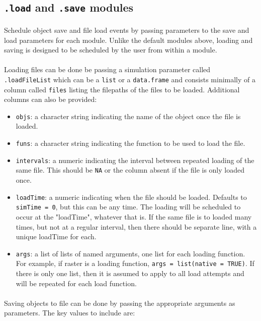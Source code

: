 \documentclass{article}
\begin{document}
\subsection{\texttt{.load} and \texttt{.save} modules}\label{load-and-save-modules}
\paragraph{}
Schedule object save and file load events by passing parameters to the save and load parameters for each module. Unlike the default modules above, loading and saving is designed to be scheduled by the user from within a module.

\paragraph{}
Loading files can be done be passing a simulation parameter called \texttt{.loadFileList} which can be a \texttt{list} or a \texttt{data.frame} and consists minimally of a column called \texttt{files} listing the filepaths of the files to be loaded. Additional columns can also be provided:

\begin{itemize}
  \item \texttt{objs}: a character string indicating the name of the object once the file is loaded.
  \item \texttt{funs}: a character string indicating the function to be used to load the file.
  \item \texttt{intervals}: a numeric indicating the interval between repeated loading of the same file. This should be \texttt{NA} or the column absent if the file is only loaded once.
  \item \texttt{loadTime}: a numeric indicating when the file should be loaded. Defaults to \texttt{simTime = 0}, but this can be any time. The loading will be scheduled to occur at the "loadTime", whatever that is. If the same file is to loaded many times, but not at a regular interval, then there should be separate line, with a unique loadTime for each.
  \item \texttt{args}: a list of lists of named arguments, one list for each loading function. For example, if raster is a loading function, \texttt{args = list(native = TRUE)}. If there is only one list, then it is assumed to apply to all load attempts and will be repeated for each load function.
\end{itemize}

\paragraph{}
Saving objects to file can be done by passing the appropriate arguments as parameters. The key values to include are:
\end{document}

